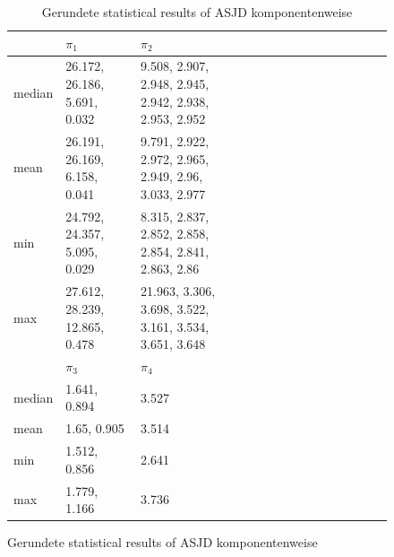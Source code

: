 \documentclass{scrartcl}
\begin{document}
    \begin{figure}[H]
        \begin{table}[H]
            \centering
            \begin{tabular}{|l|l|l|l|l|l|l|l|l|l|l|l|l|l|l|}
                \hline & $\pi_1$ & $\pi_2$ \\ \hline
                median & 26.172, 26.186, 5.691, 0.032 & 9.508, 2.907, 2.948, 2.945, 2.942, 2.938, 2.953, 2.952 \\\hline
                mean & 26.191, 26.169, 6.158, 0.041 & 9.791, 2.922, 2.972, 2.965, 2.949, 2.96, 3.033, 2.977 \\\hline
                min & 24.792, 24.357, 5.095, 0.029 & 8.315, 2.837, 2.852, 2.858, 2.854, 2.841, 2.863, 2.86 \\\hline
                max & 27.612, 28.239, 12.865, 0.478 & 21.963, 3.306, 3.698, 3.522, 3.161, 3.534, 3.651, 3.648 \\\hline
                \hline & $\pi_3$ & $\pi_4$ \\ \hline
                median & 1.641, 0.894 & 3.527 \\\hline
                mean & 1.65, 0.905 & 3.514 \\\hline
                min & 1.512, 0.856 & 2.641 \\\hline
                max & 1.779, 1.166 & 3.736 \\\hline
            \end{tabular}
            \caption{Gerundete statistical results of ASJD komponentenweise}
            \label{stat_results_asjd}
        \end{table}
    \end{figure}
\end{document}
